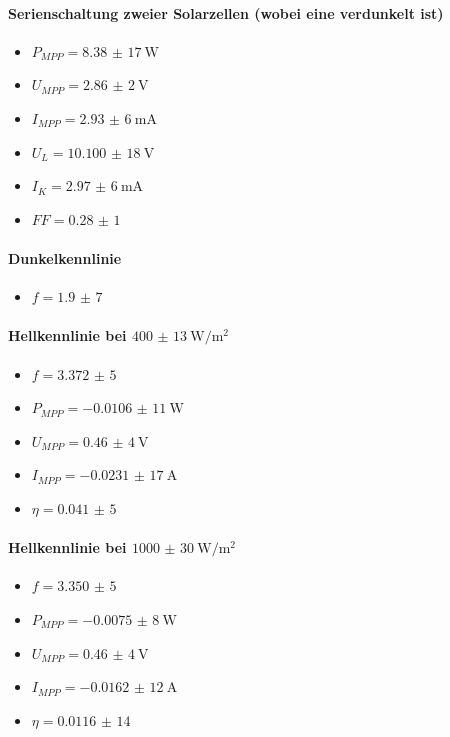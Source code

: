 \documentclass[english, ngerman]{scrartcl}
\begin{document}
\paragraph{Serienschaltung zweier Solarzellen (wobei eine verdunkelt ist)}
\begin{itemize}
    \item $P_{MPP} = \SI{8,38(17)}{\watt}$
    \item $U_{MPP} = \SI{2,86(2)}{\volt}$
    \item $I_{MPP} = \SI{2,93(6)}{\milli\ampere}$
    \item $U_{L} = \SI{10,100(18)}{\volt}$
    \item $I_{K} = \SI{2,97(6)}{\milli\ampere}$
    \item $FF = \num{0,28(1)}$
\end{itemize}

\paragraph{Dunkelkennlinie}
\begin{itemize}
    \item $f = \num{1,9(7)}$
\end{itemize}
\paragraph{Hellkennlinie bei $\SI{400(13)}{\watt\per\square\meter}$}
\begin{itemize}
    \item $f = \num{3,372(5)}$
    \item $P_{MPP} = \SI{-0,0106(11)}{\watt}$
    \item $U_{MPP} = \SI{0,46(4)}{\volt}$
    \item $I_{MPP} = \SI{-0,0231(17)}{\ampere}$
    \item $\eta = \num{0,041(5)}$
\end{itemize}
\paragraph{Hellkennlinie bei $\SI{1000(30)}{\watt\per\square\meter}$}
\begin{itemize}
    \item $f = \num{3,350(5)}$
    \item $P_{MPP} = \SI{-0,0075(8)}{\watt}$
    \item $U_{MPP} = \SI{0,46(4)}{\volt}$
    \item $I_{MPP} = \SI{-0,0162(12)}{\ampere}$
    \item $\eta = \num{0,0116(14)}$
\end{itemize}
\end{document}
